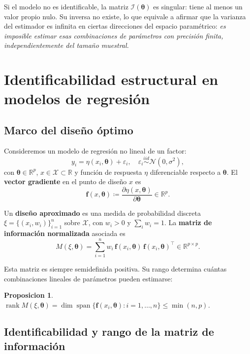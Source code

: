 \documentclass[11pt, a4paper]{article}
\newtheorem{proposition}{Proposicion}
\DeclareMathOperator{\rank}{rank}
\DeclareMathOperator{\spn}{span}
\newcommand{\R}{\mathbb{R}}
\newcommand{\btheta}{\boldsymbol{\theta}}
\newcommand{\ff}{\mathbf{f}}
\begin{document}
Si el modelo no es identificable, la matriz $\mathcal{I}(\btheta)$ es singular: tiene al menos
un valor propio nulo.  Su inversa no existe, lo que equivale a afirmar que la varianza del
estimador es infinita en ciertas direcciones del espacio param\'etrico: \emph{es imposible
estimar esas combinaciones de par\'ametros con precisi\'on finita, independientemente del
tama\~no muestral.}

\section{Identificabilidad estructural en modelos de regresi\'on}

\subsection{Marco del dise\~no \'optimo}

Consideremos un modelo de regresi\'on no lineal de un factor:
\[
  y_i = \eta(x_i, \btheta) + \varepsilon_i,
  \quad \varepsilon_i \stackrel{iid}{\sim} \mathcal{N}(0, \sigma^2),
\]
con $\btheta \in \R^p$, $x \in \mathcal{X} \subset \R$ y funci\'on de respuesta $\eta$
diferenciable respecto a $\btheta$.  El \textbf{vector gradiente} en el punto de dise\~no $x$
es
\[
  \ff(x, \btheta) \coloneqq \frac{\partial \eta(x, \btheta)}{\partial \btheta} \in \R^p.
\]

Un \textbf{dise\~no aproximado} es una medida de probabilidad discreta
$\xi = \{(x_i, w_i)\}_{i=1}^n$ sobre $\mathcal{X}$, con $w_i > 0$ y $\sum_i w_i = 1$.
La \textbf{matriz de informaci\'on normalizada} asociada es
\[
  M(\xi, \btheta)
  = \sum_{i=1}^{n} w_i \, \ff(x_i, \btheta)\,\ff(x_i, \btheta)^\top
  \in \R^{p \times p}.
\]

Esta matriz es siempre semidefinida positiva.  Su rango determina cuántas combinaciones
lineales de par\'ametros pueden estimarse:

\begin{proposition}
$\rank M(\xi, \btheta)
  = \dim\spn\{\ff(x_i, \btheta) : i = 1, \ldots, n\}
  \leq \min(n, p)$.
\end{proposition}

\subsection{Identificabilidad y rango de la matriz de informaci\'on}
\end{document}
